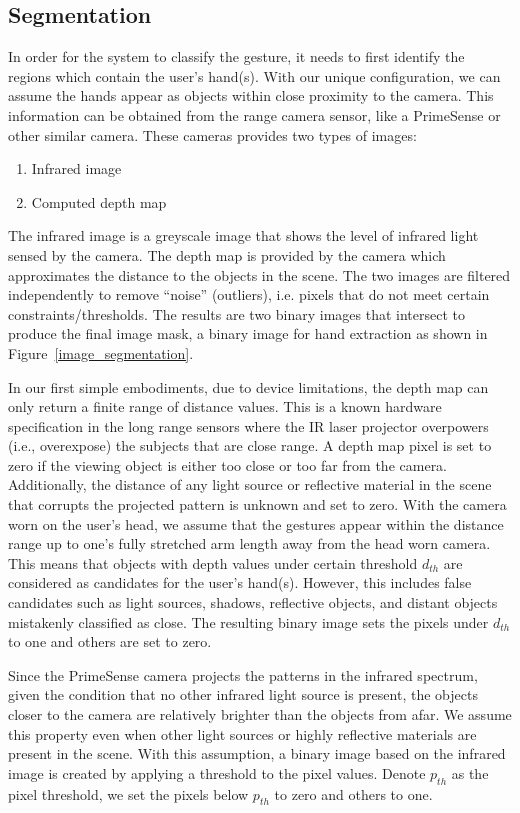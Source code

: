 \subsection{Segmentation}
In order for the system to classify the gesture, it needs to first identify the regions which contain the user's hand(s). With our unique configuration,
we can assume the hands appear as objects within close proximity to the camera.
This information can be obtained from the range camera sensor,
like a PrimeSense or other similar camera. These cameras provides two
types of images:
\begin{enumerate}
\item Infrared image
\item Computed depth map
\end{enumerate}
The infrared image is a greyscale image that shows the level of infrared
light sensed by the camera. The depth map is provided by the camera which
approximates the distance to the objects in the scene. The two images are
filtered independently to remove ``noise'' (outliers),
i.e. pixels that do not meet certain
constraints/thresholds. The results are two binary images that intersect
to produce the final image mask, a binary image for hand extraction as
shown in Figure~\ref{image_segmentation}.

In our first simple embodiments, due to device limitations, the depth map
can only return a finite range of distance values. This is a known hardware
specification in the long range sensors where the IR laser projector
overpowers (i.e., overexpose) the subjects that are close range. A depth map
pixel is set to zero if the viewing object is either too close or too far from
the camera. Additionally, the distance of any light source or reflective
material in the scene that corrupts the projected pattern is unknown and set
to zero. With the camera worn on the user's head, we assume that the gestures
appear within the distance range up to one's fully stretched arm length away
from the head worn camera. This means that objects with depth values under
certain threshold $d_{th}$ are considered as candidates for the user's hand(s).
However, this includes false candidates such as light sources, shadows,
reflective objects, and distant objects mistakenly classified as close.
The resulting binary image sets the pixels under $d_{th}$ to one and others
are set to zero.

Since the PrimeSense camera projects the patterns in the infrared spectrum,
given the condition that no other infrared light source is present,
the objects closer to the camera are relatively brighter than the objects
from afar. We assume this property even when other light sources or highly
reflective materials are present in the scene. With this assumption, a binary
image based on the infrared image is created by applying a threshold to the
pixel values. Denote $p_{th}$ as the pixel threshold, we set the pixels
below $p_{th}$ to zero and others to one.

